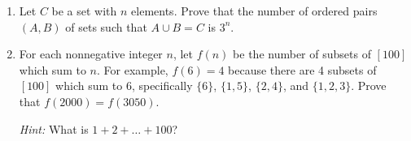 \documentclass[oneside,12pt]{memoir}
\begin{document}
\begin{enumerate}
	\item Let $C$ be a set with $n$ elements. Prove that the number of ordered pairs $(A,B)$ of sets such that $A \cup B = C$ is $3^n$.

	\item For each nonnegative integer $n$, let $f(n)$ be the number of subsets of $[100]$ which sum to $n$. For example, $f(6) = 4$ because there are 4 subsets of $[100]$ which sum to 6, specifically $\{6\}$, $\{1,5\}$, $\{2,4\}$, and $\{1,2,3\}$. Prove that $f(2000) = f(3050)$.

	      \emph{Hint:} What is $1 + 2 + \dots + 100$?
\end{enumerate}
\end{document}
